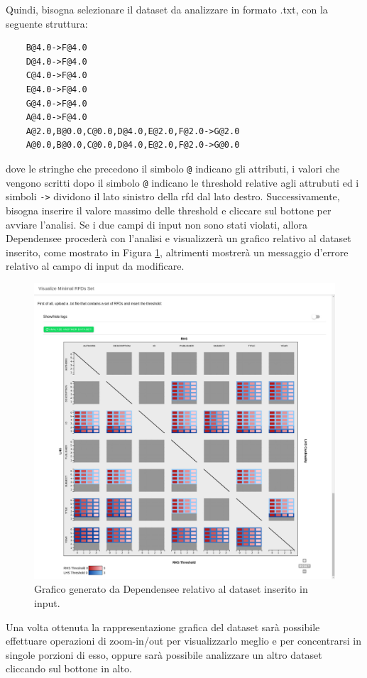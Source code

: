 Quindi, bisogna selezionare il dataset da analizzare in formato .txt, con la seguente struttura:
\begin{verbatim}
    B@4.0->F@4.0
    D@4.0->F@4.0
    C@4.0->F@4.0
    E@4.0->F@4.0
    G@4.0->F@4.0
    A@4.0->F@4.0
    A@2.0,B@0.0,C@0.0,D@4.0,E@2.0,F@2.0->G@2.0
    A@0.0,B@0.0,C@0.0,D@4.0,E@2.0,F@2.0->G@0.0
\end{verbatim}
dove le stringhe che precedono il simbolo \texttt{@} indicano gli attributi, i valori che vengono scritti dopo il simbolo \texttt{@} indicano le threshold relative agli attrubuti ed i simboli \texttt{->} dividono il lato sinistro della \acrshort{rfd} dal lato destro. Successivamente, bisogna inserire il valore massimo delle threshold e cliccare sul bottone per avviare l'analisi. Se i due campi di input non sono stati violati, allora Dependensee proceder\`{a} con l'analisi e visualizzer\`{a} un grafico relativo al dataset inserito, come mostrato in Figura \ref{fig:dependensee_dataset_analyzed}, altrimenti mostrer\`{a} un messaggio d'errore relativo al campo di input da modificare.
\begin{figure}[ht]
    \centering
    \includegraphics[width=\linewidth]{capitoli/figure/dependensee_analyzed_screen}
    \caption{Grafico generato da Dependensee relativo al dataset inserito in input.}
    \label{fig:dependensee_dataset_analyzed}
\end{figure}
Una volta ottenuta la rappresentazione grafica del dataset sar\`{a} possibile effettuare operazioni di zoom-in/out per visualizzarlo meglio e per concentrarsi in singole porzioni di esso, oppure sar\`{a} possibile analizzare un altro dataset cliccando sul bottone in alto.

